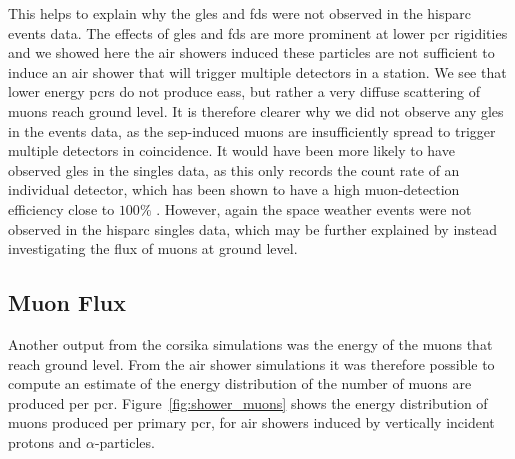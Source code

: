 
This helps to explain why the \glspl{gle} and \glspl{fd} were not observed in the \gls{hisparc} events data. The effects of \glspl{gle} and \glspl{fd} are more prominent at lower \gls{pcr} rigidities \citep{belov_solar_2005} and we showed here the air showers induced these particles are not sufficient to induce an air shower that will trigger multiple detectors in a station. We see that lower energy \glspl{pcr} do not produce \glspl{eas}, but rather a very diffuse scattering of muons reach ground level. It is therefore clearer why we did not observe any \glspl{gle} in the events data, as the \gls{sep}-induced muons are insufficiently spread to trigger multiple detectors in coincidence. It would have been more likely to have observed \glspl{gle} in the singles data, as this only records the count rate of an individual detector, which has been shown to have a high muon-detection efficiency close to $100\%$ \citep{van_dam_hisparc_2020}. However, again the space weather events were not observed in the \gls{hisparc} singles data, which may be further explained by instead investigating the flux of muons at ground level.



\subsection{Muon Flux}\label{sec:CORSIKA_flux}

Another output from the \gls{corsika} simulations was the energy of the muons that reach ground level. From the air shower simulations it was therefore possible to compute an estimate of the energy distribution of the number of muons are produced per \gls{pcr}. Figure~\ref{fig:shower_muons} shows the energy distribution of muons produced per primary \gls{pcr}, for air showers induced by vertically incident protons and $\alpha$-particles.

